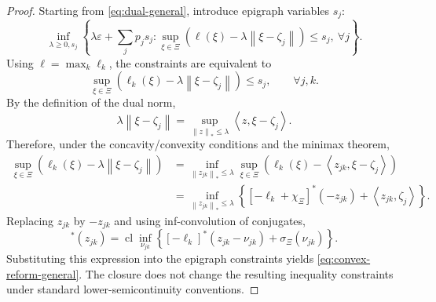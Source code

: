 \documentclass[10pt,a4paper]{amsart}
\DeclareMathOperator{\Cl}{cl}
\newcommand{\XiSet}{\Xi}
\newcommand{\inner}[2]{\left\langle #1,#2\right\rangle}
\newcommand{\norm}[1]{\left\lVert #1\right\rVert}
\begin{document}
\begin{proof}
Starting from \eqref{eq:dual-general}, introduce epigraph variables $s_j$:
\begin{equation}
\inf_{\lambda\ge0,s_j}\left\{\lambda\varepsilon+\sum_jp_js_j:
\sup_{\xi\in\XiSet}\left(\ell(\xi)-\lambda\norm{\xi-\zeta_j}\right)\le s_j,\ \forall j\right\}.
\end{equation}
Using $\ell=\max_k\ell_k$, the constraints are equivalent to
\begin{equation}\label{eq:semiinf}
    \sup_{\xi\in\XiSet}\left(\ell_k(\xi)-\lambda\norm{\xi-\zeta_j}\right)\le s_j,
    \qquad \forall j,k.
\end{equation}
By the definition of the dual norm,
\begin{equation}
    \lambda\norm{\xi-\zeta_j}=\sup_{\norm{z}_{*}\le\lambda}\inner{z}{\xi-\zeta_j}.
\end{equation}
Therefore, under the concavity/convexity conditions and the minimax theorem,
\begin{align*}
\sup_{\xi\in\XiSet}\left(\ell_k(\xi)-\lambda\norm{\xi-\zeta_j}\right)
&=\inf_{\norm{z_{jk}}_*
\le\lambda}\sup_{\xi\in\XiSet}\left(\ell_k(\xi)-\inner{z_{jk}}{\xi-\zeta_j}\right)\\
&=\inf_{\norm{z_{jk}}_*
\le\lambda}\left\{[-\ell_k+\chi_{\XiSet}]^*(-z_{jk})+\inner{z_{jk}}{\zeta_j}\right\}.
\end{align*}
Replacing $z_{jk}$ by $-z_{jk}$ and using inf-convolution of conjugates,
\begin{equation}
[-\ell_k+\chi_{\XiSet}]^*(z_{jk})
=\Cl\inf_{\nu_{jk}}\left\{[-\ell_k]^*(z_{jk}-\nu_{jk})+\sigma_{\XiSet}(\nu_{jk})\right\}.
\end{equation}
Substituting this expression into the epigraph constraints yields \eqref{eq:convex-reform-general}. The closure does not change the resulting inequality constraints under standard lower-semicontinuity conventions.
\end{proof}
\end{document}
